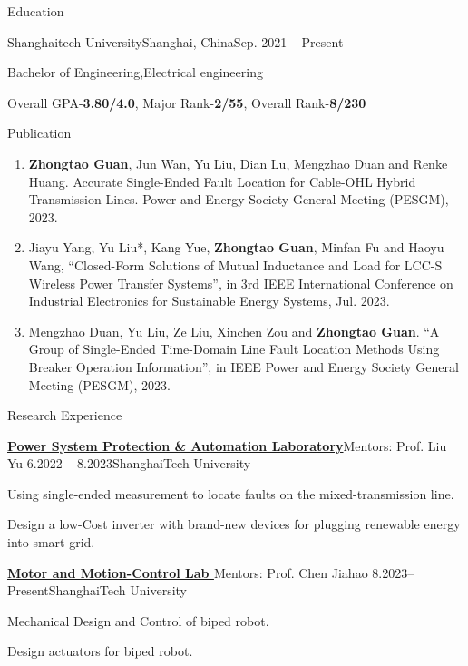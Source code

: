\documentclass[]{kyvernitis-resume}
\begin{document}
\resumeheader
{}
{}
{}
{}
{}

\begin{section}{Education}
    \begin{subsectionnobullet}{Shanghaitech University}{Shanghai, China}{Sep. 2021 -- Present}{}
        \item{Bachelor of Engineering,Electrical engineering}
       \item{Overall GPA-\textbf{3.80/4.0}, Major Rank-\textbf{2/55}, Overall Rank-\textbf{8/230}}
    \end{subsectionnobullet}
\end{section}

\begin{section}{Publication}
    \begin{enumerate}
        \item \textbf{Zhongtao Guan}, Jun Wan, Yu Liu, Dian Lu, Mengzhao Duan and Renke Huang. Accurate Single-Ended Fault Location for Cable-OHL Hybrid Transmission Lines. Power and Energy Society General Meeting (PESGM), 2023. %
        \item Jiayu Yang, Yu Liu*, Kang Yue, \textbf{Zhongtao Guan}, Minfan Fu and Haoyu Wang, “Closed-Form Solutions of Mutual Inductance and Load for LCC-S Wireless Power Transfer Systems”, in 3rd IEEE International Conference on Industrial Electronics for Sustainable Energy Systems, Jul. 2023.
        \item Mengzhao Duan, Yu Liu, Ze Liu, Xinchen Zou and \textbf{Zhongtao Guan}. “A Group of Single-Ended Time-Domain Line Fault Location Methods Using Breaker Operation Information”, in IEEE Power and Energy Society General Meeting (PESGM), 2023.%
    \end{enumerate}
\end{section}

\begin{section}{Research Experience}
\begin{subsection}{\textbf{\href{https://pspal.shanghaitech.edu.cn/}{Power System Protection \& Automation Laboratory}}}{Mentors: Prof. Liu Yu}{ 6.2022 -- 8.2023}{ShanghaiTech University}
    \item{Using single-ended measurement to locate faults on the mixed-transmission line.}
    \item{Design a low-Cost inverter with brand-new devices for plugging renewable energy into smart grid.}
\end{subsection}
\begin{subsection}{ \textbf{\href{https://faculty.sist.shanghaitech.edu.cn/chenjh/}{Motor and Motion-Control Lab }}}{Mentors: Prof. Chen Jiahao}{ 8.2023--Present}{ShanghaiTech University}
    \item{Mechanical Design and Control of biped robot.}
    \item{Design actuators for biped robot.}
\end{subsection}
\end{section}
\end{document}
